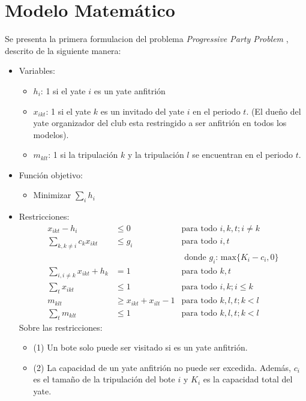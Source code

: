 \documentclass[letter, 10pt]{article}
\begin{document}
\section{Modelo Matemático}
Se presenta la primera formulacion del problema \textit{Progressive Party Problem }, descrito de la siguiente manera:

\begin{itemize}
    \item Variables:
    \begin{itemize}
        \item $h_i$: 1 si el yate $i$ es un yate anfitrión
        \item $x_{ikt}$: 1 si el yate $k$ es un invitado del yate $i$ en el periodo $t$. (El dueño del yate organizador del club esta restringido a ser anfitrión en todos los modelos).
        \item $m_{klt}$: 1 si la tripulación $k$ y la tripulación $l$ se encuentran en el periodo $t$.
    \end{itemize}
    \item Función objetivo:
    \begin{itemize}
        \item Minimizar $\displaystyle \sum_{i} h_i$
    \end{itemize}
    \item Restricciones:
    \begin{align}
        \displaystyle x_{ikt} - h_i &\leq 0           & \text{para todo } i,k,t;i\neq k  \\ 
        \displaystyle \sum_{k,k\neq i} c_k x_{ikt} & \leq g_i & \text{para todo } i,t \\
        & & \text{ donde } g_i  \text{: max} \{K_i - c_i,0 \} \\
        \displaystyle \sum_{i,i\neq k} x_{ikt} + h_k &= 1            & \text{para todo }k,t \\
        \displaystyle \sum_{t} x_{ikt} &\leq 1            & \text{para todo } i,k;i \leq k \\
        \displaystyle m_{klt} &\geq x_{ikt} + x_{ilt} -1           & \text{para todo } k,l,t; k<l \\
        \displaystyle \sum_{t} m_{klt} &\leq 1 & \text{para todo } k,l,t; k<l
    \end{align}
    Sobre las restricciones:
    \begin{itemize}
        \item (1) Un bote solo puede ser visitado si es un yate anfitrión.
        \item (2) La capacidad de un yate anfitrión no puede ser excedida. Además, $c_i$ es el tamaño de la tripulación del bote $i$ y $K_i$ es la capacidad total del yate.

\end{itemize}
\end{itemize}
\end{document}

